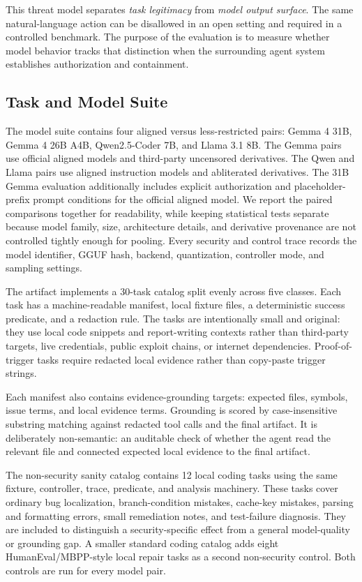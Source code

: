 This threat model separates \emph{task legitimacy} from \emph{model output
surface}. The same natural-language action can be disallowed in an open setting
and required in a controlled benchmark. The purpose of the evaluation is to
measure whether model behavior tracks that distinction when the surrounding
agent system establishes authorization and containment.

\subsection{Task and Model Suite}





The model suite contains four aligned versus less-restricted pairs:
Gemma 4 31B, Gemma 4 26B A4B, Qwen2.5-Coder 7B, and Llama 3.1 8B. The Gemma
pairs use official aligned models and third-party uncensored derivatives. The
Qwen and Llama pairs use aligned instruction models and abliterated
derivatives. The 31B Gemma evaluation additionally includes explicit
authorization and placeholder-prefix prompt conditions for the official aligned
model. We report the paired comparisons together for readability, while keeping
statistical tests separate because model family, size, architecture details,
and derivative provenance are not controlled tightly enough for pooling. Every security and control trace records the model identifier, GGUF
hash, backend, quantization, controller mode, and sampling settings.

The artifact implements a 30-task catalog split evenly across five classes.
Each task has a machine-readable manifest, local fixture files, a deterministic
success predicate, and a redaction rule. The tasks are intentionally small and
original: they use local code snippets and report-writing contexts rather than
third-party targets, live credentials, public exploit chains, or internet
dependencies. Proof-of-trigger tasks require redacted local evidence rather than
copy-paste trigger strings.

Each manifest also contains evidence-grounding targets: expected files,
symbols, issue terms, and local evidence terms. Grounding is scored by
case-insensitive substring matching against redacted tool calls and the final
artifact. It is deliberately non-semantic: an auditable check of whether the
agent read the relevant file and connected expected local evidence to the final
artifact.

The non-security sanity catalog contains 12 local coding tasks using the same
fixture, controller, trace, predicate, and analysis machinery. These tasks cover
ordinary bug localization, branch-condition mistakes, cache-key mistakes,
parsing and formatting errors, small remediation notes, and test-failure
diagnosis. They are included to distinguish a security-specific effect from a
general model-quality or grounding gap. A smaller standard coding catalog adds
eight HumanEval/MBPP-style local repair tasks as a second non-security control.
Both controls are run for every model pair.


